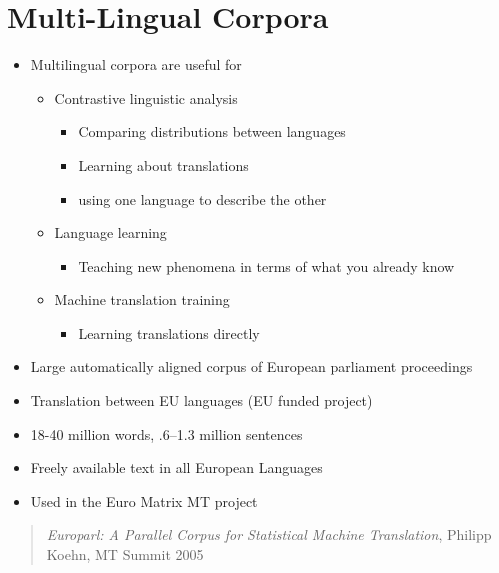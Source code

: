\documentclass[a4paper,landscape,headrule,footrule,xetex]{foils}
\begin{document}
\section{Multi-Lingual Corpora}
\MyLogo{}


\begin{itemize}
\item Multilingual corpora are useful for
  \begin{itemize}
  \item Contrastive linguistic analysis
    \begin{itemize}
    \item Comparing distributions between languages
    \item Learning about translations
    \item using one language to describe the other
    \end{itemize}
  \item Language learning
    \begin{itemize}
    \item Teaching new phenomena in terms of what you already know
    \end{itemize}
  \item Machine translation training
    \begin{itemize}
    \item Learning translations directly
    \end{itemize}
  \end{itemize}
\end{itemize}


\begin{itemize}
\item Large automatically aligned corpus of European parliament proceedings
  \item Translation between EU languages (EU funded project)
  \item 18-40 million words, .6--1.3 million sentences
  \item Freely available text in all European Languages
  \item Used in the Euro Matrix MT project
\end{itemize}
\begin{quote}
  \textit{Europarl: A Parallel Corpus for Statistical Machine Translation}, Philipp Koehn, MT Summit 2005
\end{quote}
\end{document}
